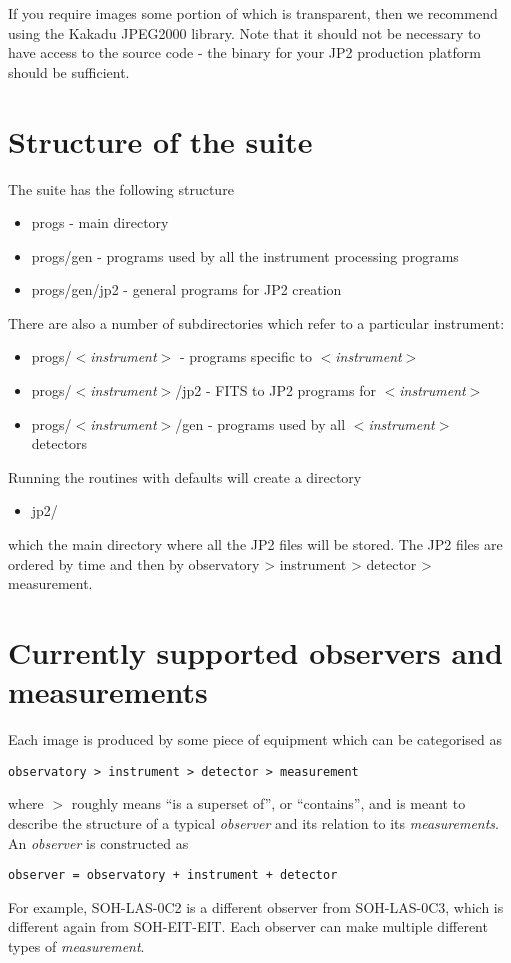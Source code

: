 \documentclass[namedreferences]{SolarPhysics}
\newcommand{\cvar}[1]{$<${\it #1}$>$}
\begin{document}
\begin{article}
If you require images some portion of which is transparent, then we
recommend using the Kakadu JPEG2000 library.  Note that it should not
be necessary to have access to the source code - the binary for your
JP2 production platform should be sufficient.



\section{Structure of the suite}\label{sec:structure}

The suite has the following structure

\begin{itemize}
\item progs - main directory
\item progs/gen - programs used by all the instrument processing programs
\item progs/gen/jp2 - general programs for JP2 creation
\end{itemize}


There are also a number of subdirectories which refer to a particular
instrument:
\begin{itemize}
\item progs/\cvar{instrument} -  programs specific to \cvar{instrument} 
\item progs/\cvar{instrument}/jp2 - FITS to JP2 programs for \cvar{instrument} 
\item progs/\cvar{instrument}/gen - programs used by all \cvar{instrument}  detectors
\end{itemize}

Running the routines with defaults will create a directory
\begin{itemize}
\item jp2/ 
\end{itemize}
which the main directory where all the JP2 files will be stored.  The
JP2 files are ordered by time and then by observatory > instrument >
detector > measurement.



\section{Currently supported observers and measurements}

Each image is produced by some piece of equipment which can be
categorised as
\begin{verbatim}
observatory > instrument > detector > measurement
\end{verbatim}
where $>$ roughly means ``is a superset of'', or ``contains'', and is
meant to describe the structure of a typical {\it observer} and its
relation to its {\it measurements}.  An {\it observer} is constructed
as
\begin{verbatim}
observer = observatory + instrument + detector
\end{verbatim}
For example, SOH-LAS-0C2 is a different observer from SOH-LAS-0C3,
which is different again from SOH-EIT-EIT.  Each observer can make
multiple different types of {\it measurement}.


\end{article}
\end{document}
